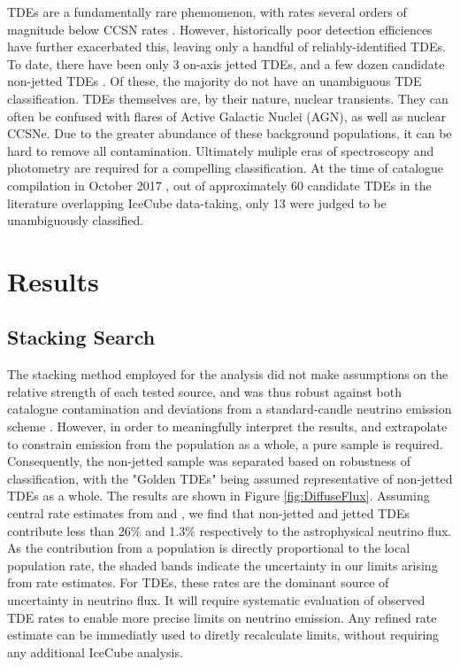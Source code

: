 \documentclass{PoS}
\begin{document}
TDEs are a fundamentally rare phemomenon, with rates several orders of magnitude below CCSN rates \cite{vanVelzen:2017qum}. However, historically poor detection efficiences have further exacerbated this, leaving only a handful of reliably-identified TDEs. To date, there have been only 3 on-axis jetted TDEs, and a few dozen candidate non-jetted TDEs \cite{Komossa:2015qya, Auchettl:2016qfa}. Of these, the majority do not have an unambiguous TDE classification. TDEs themselves are, by their nature, nuclear transients. They can often be confused with flares of Active Galactic Nuclei (AGN), as well as nuclear CCSNe. Due to the greater abundance of these background populations, it can be hard to remove all contamination. Ultimately muliple eras of spectroscopy and photometry are required for a compelling classification. At the time of catalogue compilation in October 2017 \cite{Auchettl:2016qfa}, out of approximately 60 candidate TDEs in the literature overlapping IceCube data-taking, only 13 were judged to be unambiguously classified. 

\section{Results}
\subsection{Stacking Search}

The stacking method employed for the analysis did not make assumptions on the relative strength of each tested source, and was thus robust against both catalogue contamination and deviations from a standard-candle neutrino emission scheme \cite{Stasik2018Search}. However, in order to meaningfully interpret the results, and extrapolate to constrain emission from the population as a whole, a pure sample is required. Consequently, the non-jetted sample was separated based on robustness of classification, with the "Golden TDEs" being assumed representative of non-jetted TDEs as a whole. The results are shown in Figure \ref{fig:DiffuseFlux}. Assuming central rate estimates from \cite{vanVelzen:2017qum} and \cite{Sun:2015bda}, we find that non-jetted and jetted TDEs contribute less than 26\% and 1.3\% respectively to the astrophysical neutrino flux. As the contribution from a population is directly proportional to the local population rate, the shaded bands indicate the uncertainty in our limits arising from rate estimates. For TDEs, these rates are the dominant source of uncertainty in neutrino flux. It will require systematic evaluation of observed TDE rates to enable more precise limits on neutrino emission. Any refined rate estimate can be immediatly used to diretly recalculate  limits, without requiring any additional IceCube analysis.
\end{document}
